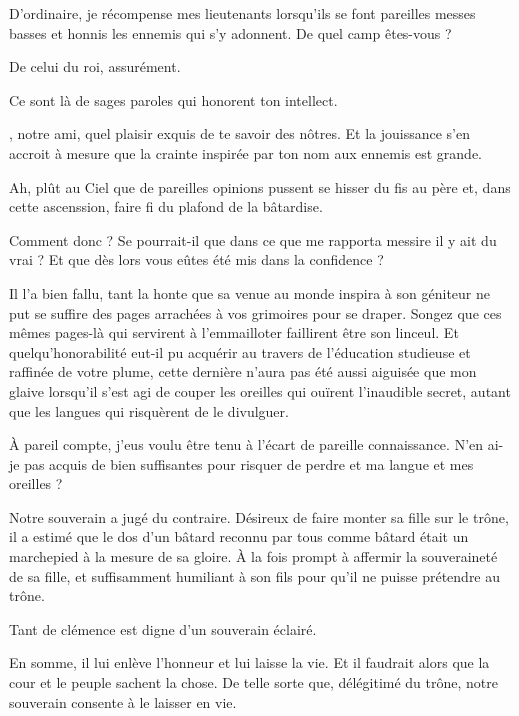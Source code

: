 \begin{drama}
  \generalspeaks D’ordinaire, je récompense mes lieutenants lorsqu’ils se font pareilles messes basses et honnis les ennemis qui s’y adonnent. De quel camp êtes-vous ? 

  \alexasspeaks De celui du roi, assurément.

  \generalspeaks Ce sont là de sages paroles qui honorent ton intellect.

  \elenaspeaks \general, notre ami, quel plaisir exquis de te savoir des nôtres. Et la jouissance s’en accroit à mesure que la crainte inspirée par ton nom aux ennemis est grande.

  \generalspeaks Ah, plût au Ciel que de pareilles opinions pussent se hisser du fis au père et, dans cette ascenssion, faire fi du plafond de la bâtardise.

  \alexasspeaks Comment donc \general ? Se pourrait-il que dans ce que me rapporta messire \elena il y ait du vrai ? Et que dès lors vous eûtes été mis dans la confidence ? 

  \generalspeaks
  Il l’a bien fallu, tant la honte que sa venue au monde inspira à son géniteur ne put se suffire des pages arrachées à vos grimoires pour se draper. Songez que ces mêmes pages-là qui servirent à l’emmailloter faillirent être son linceul.\label{sec:metaphore-papier-linceul}
  Et quelqu’honorabilité eut-il pu acquérir au travers de l’éducation studieuse et raffinée de votre plume, cette dernière n’aura pas été aussi aiguisée que mon glaive lorsqu’il s’est agi de couper les oreilles qui ouïrent l’inaudible secret, autant que les langues qui risquèrent de le divulguer.

  \alexasspeaks À pareil compte, j’eus voulu être tenu à l’écart de pareille connaissance. N’en ai-je pas acquis de bien suffisantes pour risquer de perdre et ma langue et mes oreilles ?

  \generalspeaks Notre souverain a jugé du contraire. Désireux de faire monter sa fille sur le trône, il a estimé que le dos d’un bâtard reconnu par tous comme bâtard était un marchepied à la mesure de sa gloire. À la fois prompt à affermir la souveraineté de sa fille, et suffisamment humiliant à son fils pour qu’il ne puisse prétendre au trône.

  \elenaspeaks Tant de clémence est digne d’un souverain éclairé.

  \alexasspeaks En somme, il lui enlève l’honneur et lui laisse la vie. Et il faudrait alors que la cour et le peuple sachent la chose. De telle sorte que, délégitimé du trône, notre souverain consente à le laisser en vie.


\end{drama}
